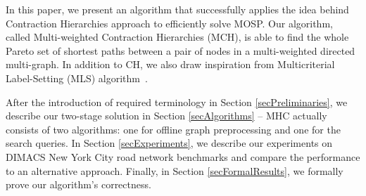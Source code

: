 
In this paper, we present an algorithm that successfully applies the idea behind Contraction Hierarchies approach to efficiently solve MOSP. Our algorithm, called Multi-weighted Contraction Hierarchies (MCH), is able to find the whole Pareto set of shortest paths between a pair of nodes in a multi-weighted directed multi-graph. In addition to CH, we also draw inspiration from Multicriterial Label-Setting (MLS) algorithm~\cite{martins1984multicriteria}. 








After the introduction of required terminology in Section \ref{secPreliminaries}, we describe our two-stage solution in Section \ref{secAlgorithms} -- MHC actually consists of two algorithms: one for offline graph preprocessing and one for the search queries. In Section \ref{secExperiments}, we describe our experiments on DIMACS New York City road network benchmarks and compare the performance to an alternative approach. Finally, in Section \ref{secFormalResults}, we formally prove our algorithm's correctness.

